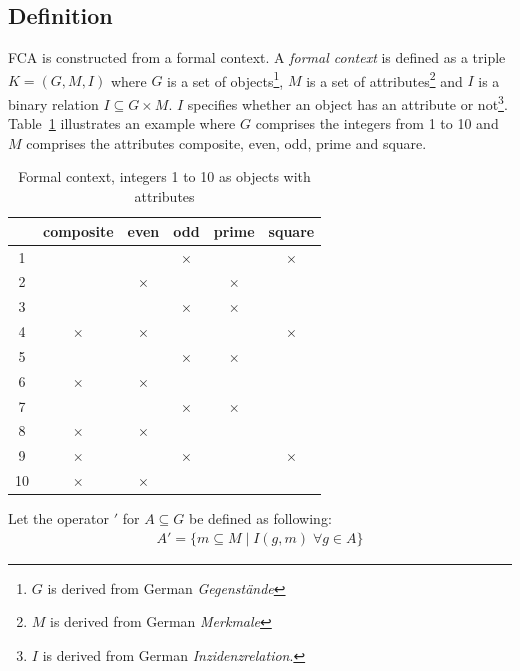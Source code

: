 \documentclass[11pt]{report}
\begin{document}
\subsection{Definition}

FCA \cite{Ganter2012} is constructed from a formal context. A \textit{formal context} is defined as a triple $K = (G, M, I)$ where $G$ is a set of objects\footnote{$G$ is derived from German \textit{Gegenstände}}, $M$ is a set of attributes\footnote{$M$ is derived from German \textit{Merkmale}} and $I$ is a binary relation $I \subseteq G \times M$. $I$ specifies whether an object has an attribute or not\footnote{$I$ is derived from German \textit{Inzidenzrelation}.}. Table~\ref{table:example} illustrates an example where $G$ comprises the integers from 1 to 10 and $M$ comprises the attributes composite, even, odd, prime and square. \\


\begin{table}[h]
\caption{Formal context, integers 1 to 10 as objects with attributes}
\label{table:example}
\centering

\def\arraystretch{1.2}%
\begin{tabular}{ | c | c c c c c |}
\hline
  & composite & even & odd & prime & square\\
\hline

1 & & & $\times$ & &$\times$\\ 
2 & & $\times$ & & $\times$ &\\
3 & & & $\times$ & $\times$ &\\ 
4 & $\times$ & $\times$ & & & $\times$\\
5 & & & $\times$ & $\times$ &\\
6 & $\times$ & $\times$ & & &\\
7 & & & $\times$ & $\times$ &\\ 
8 & $\times$ & $\times$ & & &\\
9 & $\times$ & & $\times$ & & $\times$\\
10 & $\times$ & $\times$ & & &\\ \hline


\end{tabular}
\end{table}

Let the operator $'$ for $A \subseteq G$ be defined as following:
\begin{align*}
	A' = \{ m \subseteq M\; |\;  I(g, m)\;   \forall g \in A\}
\end{align*}
\end{document}
